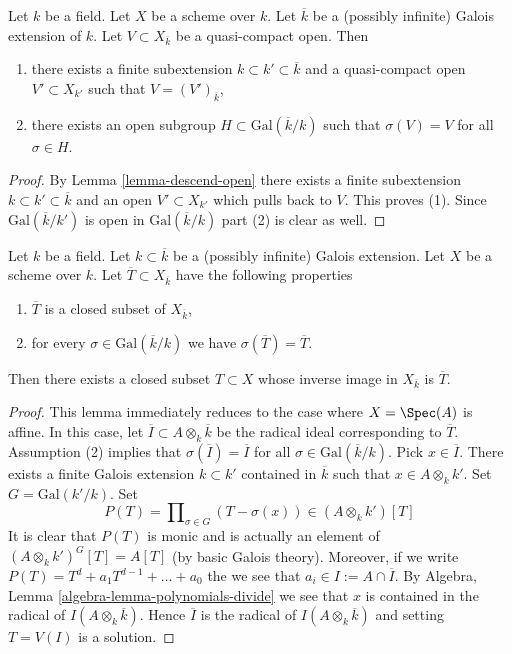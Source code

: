 \begin{lemma}
\label{lemma-Galois-action-quasi-compact-open}
Let $k$ be a field. Let $X$ be a scheme over $k$.
Let $\overline{k}$ be a (possibly infinite) Galois extension of $k$.
Let $V \subset X_{\overline{k}}$ be a quasi-compact open.
Then
\begin{enumerate}
\item there exists a finite subextension $k \subset k' \subset \overline{k}$
and a quasi-compact open $V' \subset X_{k'}$ such that
$V = (V')_{\overline{k}}$,
\item there exists an open subgroup $H \subset \text{Gal}(\overline{k}/k)$
such that $\sigma(V) = V$ for all $\sigma \in H$.
\end{enumerate}
\end{lemma}

\begin{proof}
By Lemma \ref{lemma-descend-open} there exists a finite subextension
$k \subset k' \subset \overline{k}$ and an open $V' \subset X_{k'}$
which pulls back to $V$. This proves (1). Since $\text{Gal}(\overline{k}/k')$
is open in $\text{Gal}(\overline{k}/k)$ part (2) is clear as well.
\end{proof}

\begin{lemma}
\label{lemma-closed-fixed-by-Galois}
Let $k$ be a field. Let $k \subset \overline{k}$ be a (possibly infinite)
Galois extension. Let $X$ be a scheme over $k$. Let
$\overline{T} \subset X_{\overline{k}}$ have the following properties
\begin{enumerate}
\item $\overline{T}$ is a closed subset of $X_{\overline{k}}$,
\item for every $\sigma \in \text{Gal}(\overline{k}/k)$
we have $\sigma(\overline{T}) = \overline{T}$.
\end{enumerate}
Then there exists a closed subset $T \subset X$ whose inverse image
in $X_{\overline{k}}$ is $\overline{T}$.
\end{lemma}

\begin{proof}
This lemma immediately reduces to the case where $X = \Spec(A)$
is affine. In this case, let $\overline{I} \subset A \otimes_k \overline{k}$
be the radical ideal corresponding to $\overline{T}$.
Assumption (2) implies that $\sigma(\overline{I}) = \overline{I}$
for all $\sigma \in \text{Gal}(\overline{k}/k)$.
Pick $x \in \overline{I}$. There exists a finite Galois extension
$k \subset k'$ contained in $\overline{k}$ such that $x \in A \otimes_k k'$.
Set $G = \text{Gal}(k'/k)$. Set
$$
P(T) = \prod\nolimits_{\sigma \in G} (T - \sigma(x)) \in (A \otimes_k k')[T]
$$
It is clear that $P(T)$ is monic and is actually an element of
$(A \otimes_k k')^G[T] = A[T]$ (by basic Galois theory).
Moreover, if we write $P(T) = T^d + a_1T^{d - 1} + \ldots + a_0$
the we see that $a_i \in I := A \cap \overline{I}$. By
Algebra, Lemma \ref{algebra-lemma-polynomials-divide}
we see that $x$ is contained in the radical of $I(A \otimes_k \overline{k})$.
Hence $\overline{I}$ is the radical of $I(A \otimes_k \overline{k})$ and
setting $T = V(I)$ is a solution.
\end{proof}

